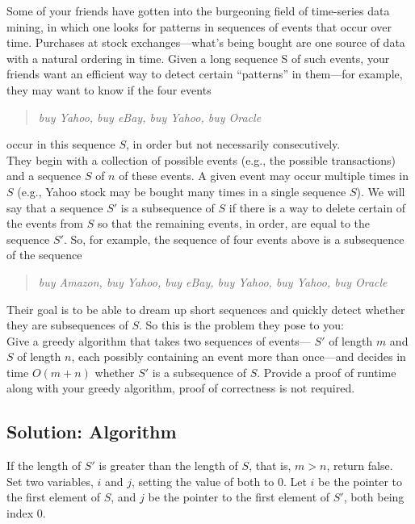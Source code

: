 \documentclass[letter,11pt]{article}
\begin{document}
Some of your friends have gotten into the burgeoning field of time-series data mining, in which one looks for patterns in sequences of events that
occur over time. Purchases at stock exchanges—what’s being bought are one source of data with a natural ordering in time. Given a long sequence S of such events, your friends want an efficient way to detect
certain “patterns” in them—for example, they may want to know if the four events
\begin{quote}
\textit{buy Yahoo, buy eBay, buy Yahoo, buy Oracle}
\end{quote}
occur in this sequence $S$, in order but not necessarily consecutively. \\They begin with a collection of possible events (e.g., the possible transactions) and a sequence $S$ of $n$ of these events. A given event may occur multiple times in $S$ (e.g., Yahoo stock may be bought many times
in a single sequence $S$). We will say that a sequence $S'$ is a subsequence of $S$ if there is a way to delete certain of the events from $S$ so that the remaining events, in order, are equal to the sequence $S'$. So, for example, the sequence of four events above is a subsequence of the sequence

\begin{quote}
\textit{buy Amazon, buy Yahoo, buy eBay, buy Yahoo, buy Yahoo, buy Oracle}
\end{quote}
Their goal is to be able to dream up short sequences and quickly detect whether they are subsequences of $S$. So this is the problem they pose to you:\\

Give a greedy algorithm that takes two sequences of events— $S'$ of
length $m$ and $S$ of length $n$, each possibly containing an event more than once—and decides in time $O(m + n)$ whether $S'$ is a subsequence of $S$.
Provide a proof of runtime along with your greedy algorithm, proof of correctness is not required.

\subsection{Solution: Algorithm}

If the length of $S'$ is greater than the length of $S$, that is, $m>n$, return false. \\

Set two variables, $i$ and $j$, setting the value of both to $0$. Let $i$ be the pointer to the first element of $S$, and $j$ be the pointer to the first element of $S'$, both being index $0$. \\
\end{document}
